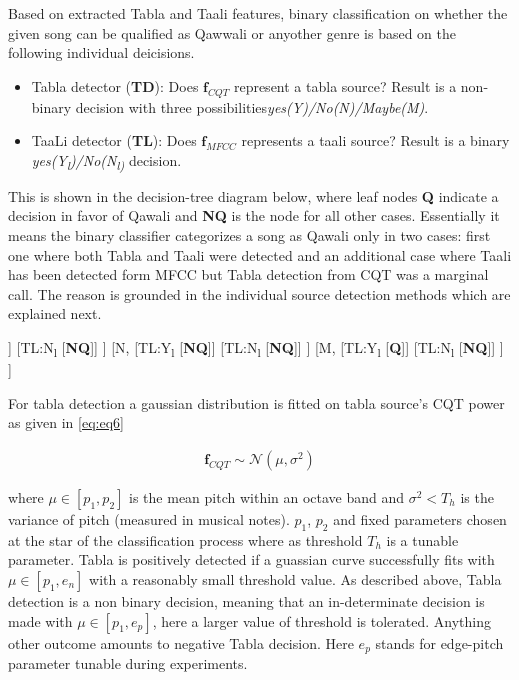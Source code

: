 \documentclass{article}
\begin{document}
Based on extracted Tabla and Taali features, binary classification on whether the given song can be qualified as Qawwali or anyother genre is based on the following individual deicisions.
\begin{itemize}
	\item Tabla detector (\textbf{TD}): Does $\boldsymbol{f}_{CQT}$ represent a tabla source? Result is a non-binary decision with three possibilities\textit{yes(Y)/No(N)/Maybe(M)}.
	\item TaaLi detector (\textbf{TL}): Does $\boldsymbol{f}_{MFCC}$ represents a taali source? Result is a binary \textit{yes(Y\textsubscript{l})/No(N\textsubscript{l)}} decision.
\end{itemize}
This is shown in the decision-tree diagram below, where leaf nodes \textbf{Q} indicate a decision in favor of Qawali and \textbf{NQ} is the node for all other cases. Essentially it means the binary classifier categorizes a song as Qawali only in two cases: first one where both Tabla and Taali were detected and an additional case where Taali has been detected form MFCC but Tabla detection from CQT was a marginal call. The reason is grounded in the individual source detection methods which are explained next.

\begin{forest}
[TD,
	[Y,
		[TL:Y\textsubscript{l}
			[\textbf{Q}]]
		[TL:N\textsubscript{l}
			[\textbf{NQ}]]
	]
	[N,
		[TL:Y\textsubscript{l}
			[\textbf{NQ}]]
		[TL:N\textsubscript{l}
			[\textbf{NQ}]]
	]
	[M,
		[TL:Y\textsubscript{l}
			[\textbf{Q}]]
		[TL:N\textsubscript{l}
			[\textbf{NQ}]]
	]
]
\end{forest}

For tabla detection a gaussian distribution is fitted on tabla source's CQT power as given in \ref{eq:eq6}

\begin{align}\label{eq:eq8}
\boldsymbol{f}_{CQT} \sim \mathcal{N}(\mu, \sigma^{2})
\end{align}

where $\mu \in [p_{1}, p_{2}]$ is the mean pitch within an octave band and $\sigma^{2} < T_{h}$ is the variance of pitch (measured in musical notes). $p_{1}$, $p_{2}$ and fixed parameters chosen at the star of the classification process where as threshold $T_{h}$ is a tunable parameter. Tabla is positively detected if a guassian curve successfully fits with $\mu \in [p_{1}, e_{n}]$ with a reasonably small threshold value. As described above, Tabla detection is a non binary decision, meaning that an in-determinate decision is made with $\mu \in [p_{1}, e_{p}]$, here a larger value of threshold is tolerated. Anything other outcome amounts to negative Tabla decision. Here $e_{p}$ stands for edge-pitch parameter tunable during experiments.  
\end{document}
